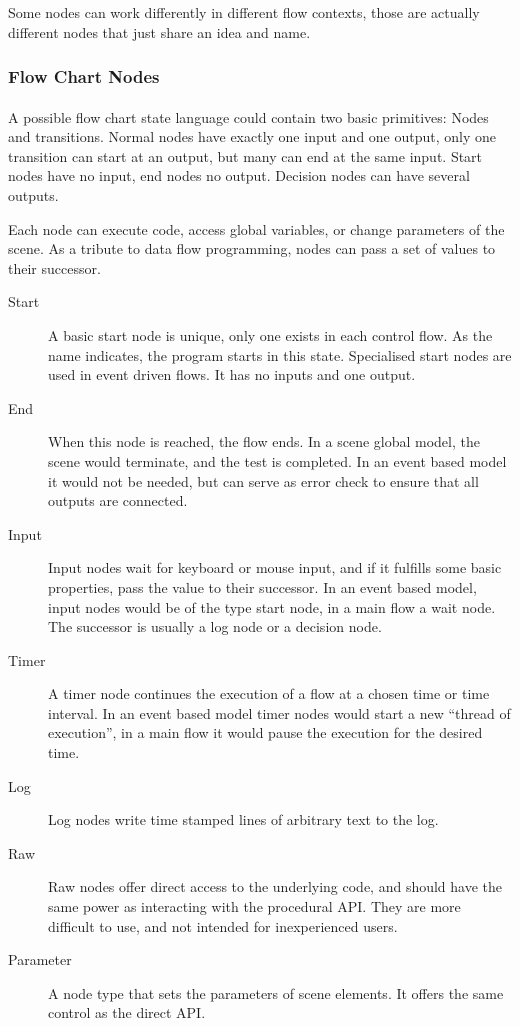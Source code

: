 Some nodes can work differently in different flow contexts, those are actually different nodes that just share an idea and name.

\subsubsection{Flow Chart Nodes}
\paragraph{}
A possible flow chart state language could contain two basic primitives: Nodes and transitions.
Normal nodes have exactly one input and one output, only one transition can start at an output, but many can end at the same input. Start nodes have no input, end nodes no output. Decision nodes can have several outputs.

Each node can  execute code, access global variables, or change parameters of the scene.
As a tribute to data flow programming, nodes can pass a set of values to their successor.

\begin{description}
\item[Start]
A basic start node is unique, only one exists in each control flow.
As the name indicates, the program starts in this state.
Specialised start nodes are used in event driven flows.
It has no inputs and one output.

\item[End]
When this node is reached, the flow ends.
In a scene global model, the scene would terminate, and the test is completed.
In an event based model it would not be needed, but can serve as error check to ensure that all outputs are connected.

\item[Input]
Input nodes wait for keyboard or mouse input, and if it fulfills some basic properties, pass the value to their successor.
In an event based model, input nodes would be of the type start node, in a main flow a wait node.
The successor is usually a log node or a decision node.

\item[Timer]
A timer node continues the execution of a flow at a chosen time or time interval.
In an event based model timer nodes would start a new ``thread of execution'',
in a main flow it would pause the execution for the desired time.

\item[Log]
Log nodes write time stamped lines of arbitrary text to the log.

\item[Raw]
Raw nodes offer direct access to the underlying code, and should have the same power as interacting with the procedural API.
They are more difficult to use, and not intended for inexperienced users.

\item[Parameter]
A node type that sets the parameters of scene elements.
It offers the same control as the direct API.

\end{description}


